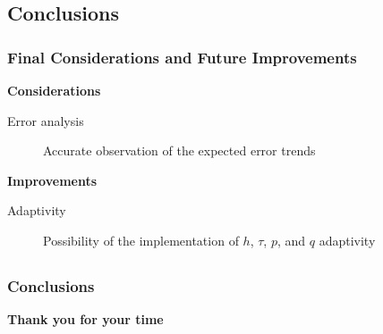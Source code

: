 \subsection{Conclusions}

\begin{frame}
    \frametitle{Final Considerations and Future Improvements}

    \vspace*{\fill}
    \begin{multicols}{2}

        \begin{center}
            {\color{\accentcolor} \Large \textbf{Considerations}}
            \vspace*{0.5cm}

            \begin{minipage}{0.4\textwidth}
                \begin{description}
                    \item[Error analysis] Accurate observation of the expected error trends
                \end{description}
            \end{minipage}
        \end{center}

        \vfill\null
        \columnbreak

        \begin{center}
            {\color{\accentcolor} \Large \textbf{Improvements}}
            \vspace*{0.5cm}

            \begin{minipage}{0.4\textwidth}
                \begin{description}
                    \item[Adaptivity] Possibility of the implementation of $h$, $\tau$, $p$, and $q$ adaptivity
                \end{description}
            \end{minipage}
        \end{center}
    \end{multicols}
    \vspace*{\fill}
    
\end{frame}

\subsection{}

\begin{frame}
    \frametitle{Conclusions}

    \vspace*{\fill}
    \begin{center}
        \Huge{\textbf{Thank you for your time}}
    \end{center}
    \vspace*{\fill}
    
\end{frame}